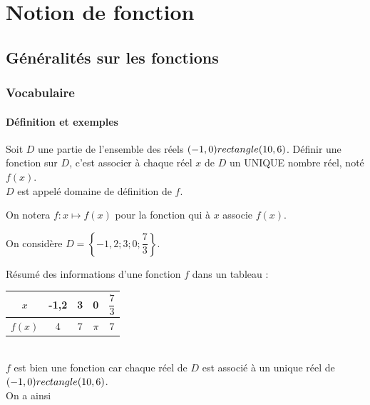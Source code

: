


\chapter{Notion de fonction}

\section{Généralités sur les fonctions}

\subsection{Vocabulaire}

\subsubsection{Définition et exemples}

\begin{Définition} 
Soit $D$ une partie de l'ensemble des réels $(-1,0) rectangle (10,6)$. Définir une fonction sur $D$, c'est associer à chaque réel $x$ de $D$ un UNIQUE nombre réel, noté $f(x)$. \\
$D$ est appelé domaine de définition de $f$.
\end{Définition}

\begin{Notation}
On notera $f : x \mapsto f(x)$ pour la fonction qui à $x$ associe $f(x)$.
\end{Notation}

\begin{Exemple} 
\begin{minipage}[c]{0.7\textwidth}


On considère $D = \left\lbrace  -1,2; 3; 0; \dfrac{7}{3} \right\rbrace$.

Résumé des informations d'une fonction $f$ dans un tableau :
\end{minipage} \hfill \begin{minipage}[c]{0.3\textwidth}
\begin{center}
\begin{tabular}{|c|c|c|c|c|}
\hline
$x$ & -1,2 & 3 & 0 & $\dfrac{7}{3}$ \\
\hline
$f(x)$ & 4 & 7 & $\pi$ & 7 \\
\hline
\end{tabular}
\end{center}
\end{minipage} \\

$f$ est bien une fonction car chaque réel de $D$ est associé à un unique réel de $(-1,0) rectangle (10,6)$. \\
On a ainsi \ligne

\end{Exemple}

